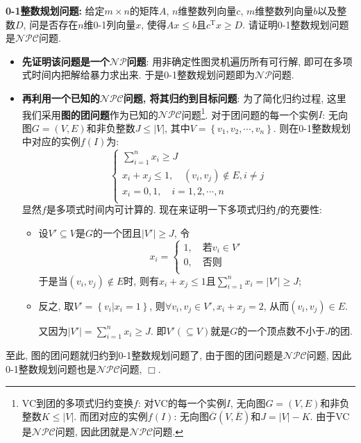 \documentclass{article}
\begin{document}
\begin{homeworkProblem}
	\textbf{0-1整数规划问题:} 给定$m\times n$的矩阵$A$, $n$维整数列向量$c$, $m$维整数列向量$b$以及整数$D$, 问是否存在$n$维0-1列向量$x$, 使得$Ax\leq b$且$c^{\text{T}}x\geq D$. 请证明0-1整数规划问题是$\mathcal{NPC}$问题.

	\solution 
	\begin{itemize}
		\item \textbf{先证明该问题是一个$\mathcal{NP}$问题}: 用非确定性图灵机遍历所有可行解, 即可在多项式时间内把解给暴力求出来. 于是0-1整数规划问题即为$\mathcal{NP}$问题.
		\item \textbf{再利用一个已知的$\mathcal{NPC}$问题, 将其归约到目标问题}: 为了简化归约过程, 这里我们采用\textbf{图的团问题}作为已知的$\mathcal{NPC}$问题\footnote{VC到团的多项式归约变换$f$: 对VC的每一个实例$I$, 无向图$G=(V,E)$和非负整数$K\leq |V|$. 而团对应的实例$f(I)$: 无向图$\overline{G}\left(V,\overline{E}\right)$和$J=|V|-K$. 由于VC是$\mathcal{NPC}$问题, 因此团就是$\mathcal{NPC}$问题.}. 对于团问题的每一个实例$I$: 无向图$G=(V,E)$和非负整数$J\leq |V|$, 其中$V=\left\{ v_1,v_2,\cdots ,v_n \right\}$. 则在0-1整数规划中对应的实例$f(I)$为: 
		$$
		\begin{cases}
			\displaystyle \sum_{i=1}^n{x_i}\ge J\\
			x_i+x_j\le 1,\quad \left( v_i,v_j \right) \notin E,i\ne j\\
			x_i=0,1,\quad i=1,2,\cdots ,n\\
		\end{cases}
		$$
		显然$f$是多项式时间内可计算的. 现在来证明一下多项式归约$f$的充要性:
		\begin{itemize}
			\item 设$V'\subseteq V$是$G$的一个团且$\left|V'\right|\geq J$, 令$$x_i=\begin{cases}
				1,\quad \text{若}v_i\in V'\\
				0,\quad \text{否则}\\
			\end{cases}$$
			于是当$(v_i,v_j)\notin E$时, 则有$x_i+x_j\leq 1$且$\displaystyle \sum_{i=1}^n{x_i}=\left| V' \right|\ge J	$;
			\item 反之, 取$V'=\left\{ v_i|x_i=1 \right\}$, 则$\forall v_i,v_j\in V',x_i+x_j=2$, 从而$(v_i,v_j)\in E$. 
			
			又因为$\displaystyle \left| V' \right|=\sum_{i=1}^n{x_i}\ge J$. 即$V'(\subseteq V)$就是$G$的一个顶点数不小于$J$的团.
		\end{itemize}
	\end{itemize}
	至此, 图的团问题就归约到0-1整数规划问题了, 由于图的团问题是$\mathcal{NPC}$问题, 因此0-1整数规划问题也是$\mathcal{NPC}$问题, $\Box$.
\end{homeworkProblem}
\end{document}

